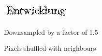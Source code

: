 \documentclass[portrait,final,a0paper,fontscale=0.277]{baposter}
\begin{document}
\begin{poster}
{{\begin{minipage}[t]{0.48\linewidth}
\begin{minipage}[t]{0.48\linewidth}
        \end{minipage}
        \begin{minipage}[t]{0.48\linewidth}
                \centering
                \includegraphics[width=\textwidth]{EntSpread}
        \end{minipage}
        \begin{minipage}[t]{0.48\linewidth}
                \centering
                \smaller Downsampled by a factor of 1.5
        \end{minipage}
        \begin{minipage}[t]{0.48\linewidth}
                \centering
                \smaller Pixels shuffled with neighbours
        \end{minipage}
    \end{minipage}
    }

}
\end{poster}
\end{document}
